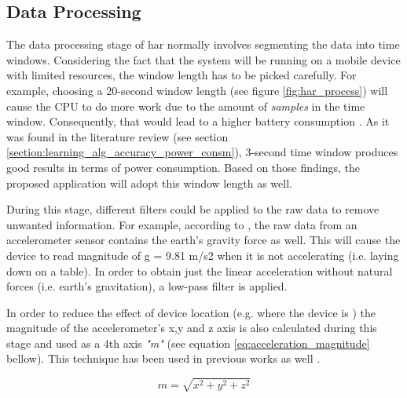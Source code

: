     
    \subsection{Data Processing}
    The data processing stage of \gls{har} normally involves segmenting the data into time windows. Considering the fact that the system will be running on a mobile device with limited resources, the window length has to be picked carefully. For example, choosing a 20-second window length (see figure \ref{fig:har_process}) will cause the CPU to do more work due to the amount of \textit{samples} in the time window. Consequently, that would lead to a higher battery consumption \citep[2]{torreshuitzil2015a}. As it was found in the literature review (see section \ref{section:learning_alg_accuracy_power_consm}), 3-second time window produces good results in terms of power consumption. Based on those findings, the proposed application will adopt this window length as well.
    
    During this stage, different filters could be applied to the raw data to remove unwanted information. For example, according to \citet[]{googlemotionsensors}, the raw data from an accelerometer sensor contains the earth's gravity force as well. This will cause the device to read magnitude of g = 9.81 m/s2 when it is not accelerating (i.e. laying down on a table). In order to obtain just the linear acceleration without natural forces (i.e. earth's gravitation), a low-pass filter is applied.
    
    In order to reduce the effect of device location (e.g. where the device is ) the magnitude of the accelerometer's x,y and z axis is also calculated during this stage and used as a 4th axis \textit{"m"} (see equation \ref{eq:acceleration_magnitude} bellow). This technique has been used in previous works as well \citep[153]{torreshuitzil2015b}.
    
    \begin{equation}
        \label{eq:acceleration_magnitude}
        m = \sqrt{x^2 + y^2 + z^2}
    \end{equation}
    

